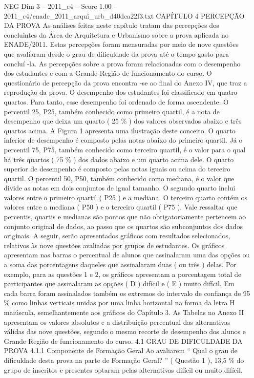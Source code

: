 \begin{textsample}{NEG Dim 3 – 2011\_c4 – Score 1.00 – 2011\_c4/enade\_2011\_arqui\_urb\_d40dca22f3.txt}  \label{ex:f3_neg_060}
CAPÍTULO 4 PERCEPÇÃO DA PROVA As análises feitas neste capítulo tratam das percepções dos concluintes da Área de Arquitetura e Urbanismo sobre a prova aplicada no ENADE/2011.
Estas percepções foram mensuradas por meio de nove questões que avaliaram desde o grau de dificuldade da prova até o tempo gasto para concluí -la.
As percepções sobre a prova foram relacionadas com o desempenho dos estudantes e com a Grande Região de funcionamento do curso.
O questionário de percepção da prova encontra -se ao final do Anexo IV, que traz a reprodução da prova.
O desempenho dos estudantes foi classificado em quatro quartos.
Para tanto, esse desempenho foi ordenado de forma ascendente.
O percentil 25, P25, também conhecido como primeiro quartil, é a nota de desempenho que deixa um quarto ( 25 \% ) dos valores observados abaixo e três quartos acima.
A Figura 1 apresenta uma ilustração deste conceito.
O quarto inferior de desempenho é composto pelas notas abaixo do primeiro quartil.
Já o percentil 75, P75, também conhecido como terceiro quartil, é o valor para o qual há três quartos ( 75 \% ) dos dados abaixo e um quarto acima dele.
O quarto superior de desempenho é composto pelas notas iguais ou acima do terceiro quartil.
O percentil 50, P50, também conhecido como mediana, é o valor que divide as notas em dois conjuntos de igual tamanho.
O segundo quarto inclui valores entre o primeiro quartil ( P25 ) e a mediana.
O terceiro quarto contém os valores entre a mediana ( P50 ) e o terceiro quartil ( P75 ).
Vale ressaltar que percentis, quartis e medianas são pontos que não obrigatoriamente pertencem ao conjunto original de dados, ao passo que os quartos são subconjuntos dos dados originais.
A seguir, serão apresentados gráficos com resultados selecionados, relativos às nove questões avaliadas por grupos de estudantes.
Os gráficos apresentam nas barras o percentual de alunos que assinalaram uma das opções ou a soma das porcentagens daqueles que assinalaram duas ( ou três ) delas.
Por exemplo, para as questões 1 e 2, os gráficos apresentam a porcentagem total de participantes que assinalaram as opções ( D ) difícil e ( E ) muito difícil.
Em cada barra foram assinalados também os extremos do intervalo de confiança de 95 \% como linhas verticais unidas por uma linha horizontal na forma da letra H maiúscula, semelhantemente aos gráficos do Capítulo 3.
As Tabelas no Anexo II apresentam os valores absolutos e a distribuição percentual das alternativas válidas das nove questões, segundo o mesmo recorte de desempenho dos alunos e Grande Região de funcionamento do curso. 4.1 GRAU DE DIFICULDADE DA PROVA 4.1.1 Componente de Formação Geral Ao avaliarem “ Qual o grau de dificuldade desta prova na parte de Formação Geral? ” ( Questão 1 ), 13,5 \% do grupo de inscritos e presentes optaram pelas alternativas difícil ou muito difícil.

\end{textsample}
